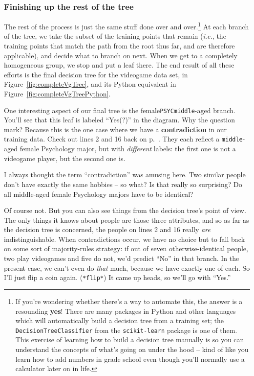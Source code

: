\subsubsection{Finishing up the rest of the tree}

The rest of the process is just the same stuff done over and over.\footnote{If
you're wondering whether there's a way to automate this, the answer is a
resounding \textbf{yes}! There are many packages in Python and other languages
which will automatically build a decision tree from a training set; the
\texttt{DecisionTreeClassifier} from the \texttt{scikit-learn} package is one
of them. This exercise of learning how to build a decision tree manually is so
you can understand the concepts of what's going on under the hood -- kind of
like you learn how to add numbers in grade school even though you'll normally
use a calculator later on in life.} At each branch of the tree, we take the
subset of the training points that remain (\textit{i.e.}, the training points
that match the path from the root thus far, and are therefore applicable), and
decide what to branch on next. When we get to a completely homogeneous group,
we stop and put a leaf there. The end result of all these efforts is the final
decision tree for the videogame data set, in Figure~\ref{fig:completeVgTree},
and its Python equivalent in Figure~\ref{fig:completeVgTreePython}.


One interesting aspect of our final tree is the
female\texttt{PSYC}\texttt{middle}-aged branch.
You'll see that this leaf is labeled ``Yes(?)'' in the diagram. Why the
question mark? Because this is the one case where we have a
\textbf{contradiction} in our training data. Check out lines 2 and 16 back on
p.~\pageref{vgDataSet}. They each reflect a \texttt{middle}-aged female
Psychology major, but with \textit{different} labels: the first one is not a
videogame player, but the second one is.

I always thought the term ``contradiction'' was amusing here. Two similar
people don't have exactly the same hobbies -- so what? Is that really so
surprising? Do all middle-aged female Psychology majors have to be identical?

Of course not. But you can also see things from the decision tree's point of
view. The only things it knows about people are those three attributes, and so
as far as the decision tree is concerned, the people on lines 2 and 16 really
\textit{are} indistinguishable. When contradictions occur, we have no choice
but to fall back on some sort of majority-rules strategy: if out of seven
otherwise-identical people, two play videogames and five do not, we'd predict
``No'' in that branch. In the present case, we can't even do \textit{that}
much, because we have exactly one of each. So I'll just flip a coin again.
(\texttt{*flip*}) It came up heads, so we'll go with ``Yes.''

